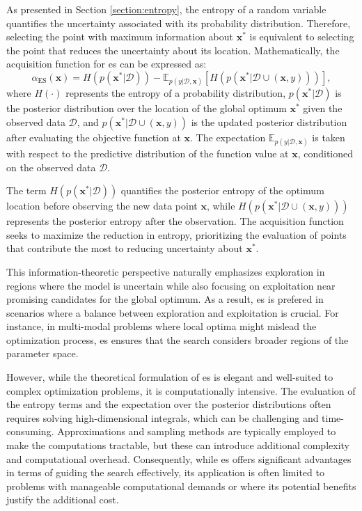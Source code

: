 As presented in Section \ref{section:entropy}, the entropy of a random variable quantifies the uncertainty associated with its probability distribution. Therefore, selecting the point with maximum information about $\mathbf{x}^*$ is equivalent to selecting the point that reduces the uncertainty about its location. Mathematically, the acquisition function for \ac{es} can be expressed as:
\begin{equation*}
    \alpha_{\text{ES}}(\mathbf{x}) = H(p(\mathbf{x}^* \vert \mathcal{D})) - \mathbb{E}_{p(y \vert \mathcal{D}, \mathbf{x})} \left[ H(p(\mathbf{x}^* \vert \mathcal{D} \cup (\mathbf{x}, y)))\right],
\end{equation*}
where $H(\cdot)$ represents the entropy of a probability distribution, $p(\mathbf{x}^* \vert \mathcal{D})$ is the posterior distribution over the location of the global optimum $\mathbf{x}^*$ given the observed data $\mathcal{D}$, and $p(\mathbf{x}^* \vert \mathcal{D} \cup (\mathbf{x}, y))$ is the updated posterior distribution after evaluating the objective function at $\mathbf{x}$. The expectation $\mathbb{E}_{p(y \vert \mathcal{D}, \mathbf{x})}$ is taken with respect to the predictive distribution of the function value at $\mathbf{x}$, conditioned on the observed data $\mathcal{D}$.

The term $H(p(\mathbf{x}^* \vert \mathcal{D}))$ quantifies the posterior entropy of the optimum location before observing the new data point $\mathbf{x}$, while $H(p(\mathbf{x}^* \vert \mathcal{D} \cup (\mathbf{x}, y)))$ represents the posterior entropy after the observation. The acquisition function seeks to maximize the reduction in entropy, prioritizing the evaluation of points that contribute the most to reducing uncertainty about $\mathbf{x}^*$.

This information-theoretic perspective naturally emphasizes exploration in regions where the model is uncertain while also focusing on exploitation near promising candidates for the global optimum. As a result, \ac{es} is prefered in scenarios where a balance between exploration and exploitation is crucial. For instance, in multi-modal problems where local optima might mislead the optimization process, \ac{es} ensures that the search considers broader regions of the parameter space.

However, while the theoretical formulation of \ac{es} is elegant and well-suited to complex optimization problems, it is computationally intensive. The evaluation of the entropy terms and the expectation over the posterior distributions often requires solving high-dimensional integrals, which can be challenging and time-consuming. Approximations and sampling methods are typically employed to make the computations tractable, but these can introduce additional complexity and computational overhead. Consequently, while \ac{es} offers significant advantages in terms of guiding the search effectively, its application is often limited to problems with manageable computational demands or where its potential benefits justify the additional cost.

